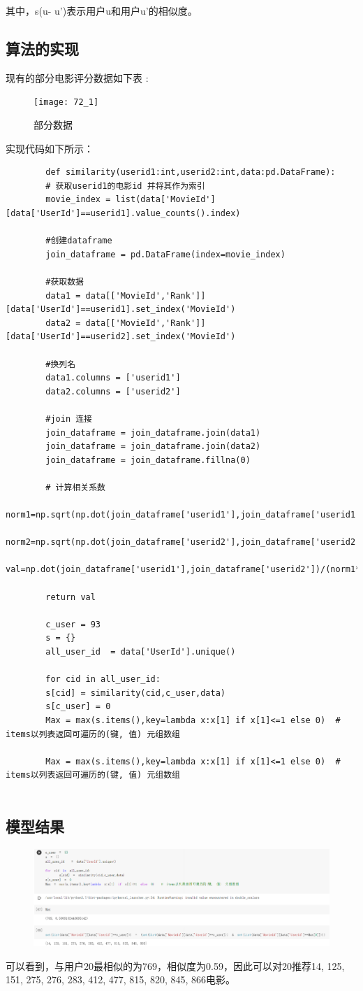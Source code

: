 \documentclass[withoutpreface,bwprint]{cumcmthesis} %
\begin{document}
	其中，s(u- u')表示用户u和用户u'的相似度。
	\subsection{算法的实现}
	\par 现有的部分电影评分数据如下表 :
	\begin{figure}[H]
		\centering
		\centerline{\texttt{[image: 72\_1]}}  
		\begin{center}
			\caption{部分数据}
		\end{center}
	\end{figure}
	\par 实现代码如下所示：
	\begin{lstlisting}
		def similarity(userid1:int,userid2:int,data:pd.DataFrame):
		# 获取userid1的电影id 并将其作为索引
		movie_index = list(data['MovieId'][data['UserId']==userid1].value_counts().index)
		
		#创建dataframe
		join_dataframe = pd.DataFrame(index=movie_index)
		
		#获取数据
		data1 = data[['MovieId','Rank']][data['UserId']==userid1].set_index('MovieId')
		data2 = data[['MovieId','Rank']][data['UserId']==userid2].set_index('MovieId')
		
		#换列名
		data1.columns = ['userid1']
		data2.columns = ['userid2']
		
		#join 连接
		join_dataframe = join_dataframe.join(data1)
		join_dataframe = join_dataframe.join(data2)
		join_dataframe = join_dataframe.fillna(0)
		
		# 计算相关系数
		norm1=np.sqrt(np.dot(join_dataframe['userid1'],join_dataframe['userid1']))
		norm2=np.sqrt(np.dot(join_dataframe['userid2'],join_dataframe['userid2']))
		val=np.dot(join_dataframe['userid1'],join_dataframe['userid2'])/(norm1*norm2)
		
		return val
		
		c_user = 93
		s = {}
		all_user_id  = data['UserId'].unique()
		
		for cid in all_user_id:
		s[cid] = similarity(cid,c_user,data)
		s[c_user] = 0
		Max = max(s.items(),key=lambda x:x[1] if x[1]<=1 else 0)  # items以列表返回可遍历的(键, 值) 元组数组
		
		Max = max(s.items(),key=lambda x:x[1] if x[1]<=1 else 0)  # items以列表返回可遍历的(键, 值) 元组数组
		
	\end{lstlisting}
	
	\subsection{模型结果}
	\begin{figure}[H]
		\centering
		\includegraphics[width=0.7\linewidth]{figures/72_2}
		\caption{}
		\label{fig:722}
	\end{figure}
	\par 可以看到，与用户20最相似的为769，相似度为0.59，因此可以对20推荐{14, 125, 151, 275, 276, 283, 412, 477, 815, 820, 845, 866}电影。
	
	
	\section{}
	
	
\end{document}
